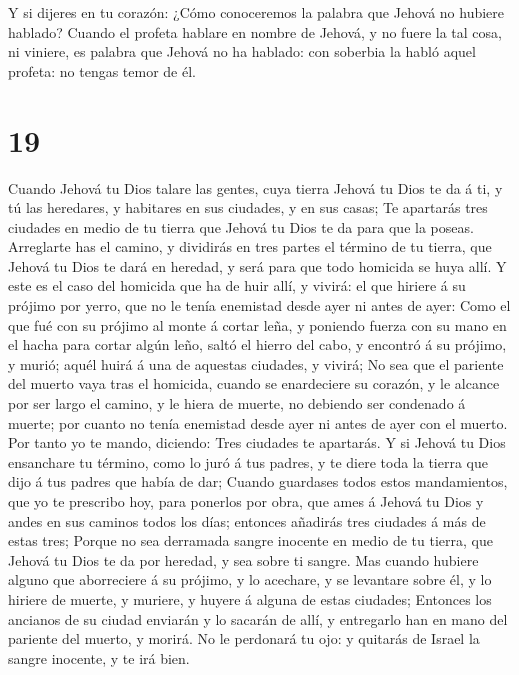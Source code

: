  Y si dijeres en tu corazón: ¿Cómo conoceremos la palabra
que Jehová no hubiere hablado?  Cuando el profeta hablare
en nombre de Jehová, y no fuere la tal cosa, ni viniere, es palabra que
Jehová no ha hablado: con soberbia la habló aquel profeta: no tengas
temor de él.

\hypertarget{section-18}{%
\section{19}\label{section-18}}

 Cuando Jehová tu Dios talare las gentes, cuya tierra Jehová
tu Dios te da á ti, y tú las heredares, y habitares en sus ciudades, y
en sus casas;  Te apartarás tres ciudades en medio de tu
tierra que Jehová tu Dios te da para que la poseas. 
Arreglarte has el camino, y dividirás en tres partes el término de tu
tierra, que Jehová tu Dios te dará en heredad, y será para que todo
homicida se huya allí.  Y este es el caso del homicida que
ha de huir allí, y vivirá: el que hiriere á su prójimo por yerro, que no
le tenía enemistad desde ayer ni antes de ayer:  Como el que
fué con su prójimo al monte á cortar leña, y poniendo fuerza con su mano
en el hacha para cortar algún leño, saltó el hierro del cabo, y encontró
á su prójimo, y murió; aquél huirá á una de aquestas ciudades, y vivirá;
 No sea que el pariente del muerto vaya tras el homicida,
cuando se enardeciere su corazón, y le alcance por ser largo el camino,
y le hiera de muerte, no debiendo ser condenado á muerte; por cuanto no
tenía enemistad desde ayer ni antes de ayer con el muerto. 
Por tanto yo te mando, diciendo: Tres ciudades te apartarás.
 Y si Jehová tu Dios ensanchare tu término, como lo juró á
tus padres, y te diere toda la tierra que dijo á tus padres que había de
dar;  Cuando guardases todos estos mandamientos, que yo te
prescribo hoy, para ponerlos por obra, que ames á Jehová tu Dios y andes
en sus caminos todos los días; entonces añadirás tres ciudades á más de
estas tres;  Porque no sea derramada sangre inocente en
medio de tu tierra, que Jehová tu Dios te da por heredad, y sea sobre ti
sangre.  Mas cuando hubiere alguno que aborreciere á su
prójimo, y lo acechare, y se levantare sobre él, y lo hiriere de muerte,
y muriere, y huyere á alguna de estas ciudades;  Entonces
los ancianos de su ciudad enviarán y lo sacarán de allí, y entregarlo
han en mano del pariente del muerto, y morirá.  No le
perdonará tu ojo: y quitarás de Israel la sangre inocente, y te irá
bien.

